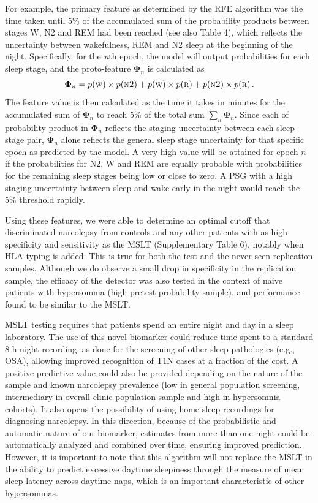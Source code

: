 For example, the primary feature as determined by the RFE algorithm was the time taken until 5\% of the accumulated sum of the probability products between stages W, N2 and REM had been reached (see also Table 4), which reflects the uncertainty between wakefulness, REM and N2 sleep at the beginning of the night.
Specifically, for the \textit{n}th epoch, the model will output probabilities for each sleep stage, and the proto-feature $\boldsymbol{\Phi}_n$ is calculated as
\begin{equation}
    \boldsymbol{\Phi}_n = p \! \left( \textsc{w} \right) \times p \! \left( \textsc{n2} \right) + p \! \left( \textsc{w} \right) \times p \! \left( \textsc{r} \right) + p \! \left( \textsc{n2} \right) \times p \! \left( \textsc{r} \right).
\end{equation}
The feature value is then calculated as the time it takes in minutes for the accumulated sum of $\boldsymbol{\Phi}_n$ to reach 5\% of the total sum $\sum_n \boldsymbol{\Phi}_n$.
Since each of probability product in $\boldsymbol{\Phi}_n$ reflects the staging uncertainty between each sleep stage pair, $\boldsymbol{\Phi}_n$ alone reflects the general sleep stage uncertainty for that specific epoch as predicted by the model.
A very high value will be attained for epoch $n$ if the probabilities for N2, W and REM are equally probable with probabilities for the remaining sleep stages being low or close to zero. 
A PSG with a high staging uncertainty between sleep and wake early in the night would reach the 5\% threshold rapidly.

Using these features, we were able to determine an optimal cutoff that discriminated narcolepsy from controls and any other patients with as high specificity and sensitivity as the MSLT (Supplementary Table 6), notably when HLA typing is added.
This is true for both the test and the never seen replication samples.
Although we do observe a small drop in specificity in the replication sample, the efficacy of the detector was also tested in the context of naive patients with hypersomnia (high pretest probability sample), and performance found to be similar to the MSLT.

MSLT testing requires that patients spend an entire night and day in a sleep laboratory.
The use of this novel biomarker could reduce time spent to a standard 8 h night recording, as done for the screening of other sleep pathologies (e.g., OSA), allowing improved recognition of T1N cases at a fraction of the cost.
A positive predictive value could also be provided depending on the nature of the sample and known narcolepsy prevalence (low in general population screening, intermediary in overall clinic population sample and high in hypersomnia cohorts). 
It also opens the possibility of using home sleep recordings for diagnosing narcolepsy. 
In this direction, because of the probabilistic and automatic nature of our biomarker, estimates from more than one night could be automatically analyzed and combined over time, ensuring improved prediction.
However, it is important to note that this algorithm will not replace the MSLT in the ability to predict excessive daytime sleepiness through the measure of mean sleep latency across daytime naps, which is an important characteristic of other hypersomnias.

